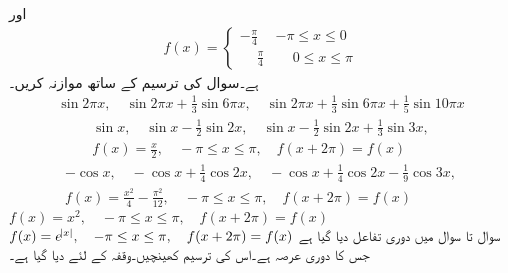 \quad {} اور
\begin{align*}
f(x)=
\begin{cases}
-\frac{\pi}{4}& -\pi \le x \le 0\\
\phantom{-}\frac{\pi}{4}&\phantom{-}0\le x \le \pi
\end{cases}
\end{align*}
ہے۔سوال  کی ترسیم کے ساتھ موازنہ کریں۔
\begin{align*}
\sin 2\pi x,\quad \sin 2\pi x+\frac{1}{3}\sin 6\pi x,\quad \sin 2\pi x+\frac{1}{3}\sin 6\pi x+\frac{1}{5}\sin 10\pi x
\end{align*}
\begin{align*}
\sin x,\quad \sin x-\frac{1}{2}\sin 2x,\quad \sin x-\frac{1}{2}\sin 2x+\frac{1}{3}\sin 3x,\\
f(x)=\frac{x}{2}, \quad  -\pi \le x \le \pi, \quad f(x+2\pi)=f(x)
\end{align*}
\begin{align*}
-\cos x,\quad -\cos x+\frac{1}{4}\cos 2x,\quad -\cos x+\frac{1}{4}\cos 2x-\frac{1}{9}\cos 3x,\\
f(x)=\frac{x^2}{4}-\frac{\pi^2}{12}, \quad  -\pi \le x \le \pi, \quad f(x+2\pi)=f(x)
\end{align*}
\quad 
$f(x)=x^2,\quad -\pi \le x \le \pi, \quad f(x+2\pi)=f(x)$
\quad 
$f(x)=e^{\abs{x}},\quad -\pi \le x \le \pi, \quad f(x+2\pi)=f(x)$
سوال  تا سوال  میں دوری تفاعل  دیا گیا ہے جس کا دوری عرصہ  ہے۔اس کی ترسیم کھینچیں۔وقفہ  کے لئے  دیا گیا ہے۔

